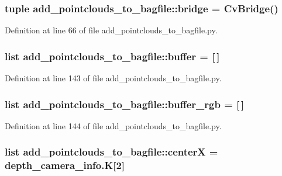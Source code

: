 \subsubsection[{bridge}]{\setlength{\rightskip}{0pt plus 5cm}tuple {\bf add\-\_\-pointclouds\-\_\-to\-\_\-bagfile\-::bridge} = \-Cv\-Bridge()}\label{namespaceadd__pointclouds__to__bagfile_aa632b7dd5b7742688880070e337ec86c}


\-Definition at line 66 of file add\-\_\-pointclouds\-\_\-to\-\_\-bagfile.\-py.

\subsubsection[{buffer}]{\setlength{\rightskip}{0pt plus 5cm}list {\bf add\-\_\-pointclouds\-\_\-to\-\_\-bagfile\-::buffer} = [$\,$]}\label{namespaceadd__pointclouds__to__bagfile_a0a61de89cbb8d477156b19f15f77e812}


\-Definition at line 143 of file add\-\_\-pointclouds\-\_\-to\-\_\-bagfile.\-py.

\subsubsection[{buffer\-\_\-rgb}]{\setlength{\rightskip}{0pt plus 5cm}list {\bf add\-\_\-pointclouds\-\_\-to\-\_\-bagfile\-::buffer\-\_\-rgb} = [$\,$]}\label{namespaceadd__pointclouds__to__bagfile_aa972df9c8636792629ac72316fd66264}


\-Definition at line 144 of file add\-\_\-pointclouds\-\_\-to\-\_\-bagfile.\-py.

\subsubsection[{center\-X}]{\setlength{\rightskip}{0pt plus 5cm}list {\bf add\-\_\-pointclouds\-\_\-to\-\_\-bagfile\-::center\-X} = depth\-\_\-camera\-\_\-info.\-K[2]}\label{namespaceadd__pointclouds__to__bagfile_a96b816cd02a6127ce33e9a95a0547f2f}


